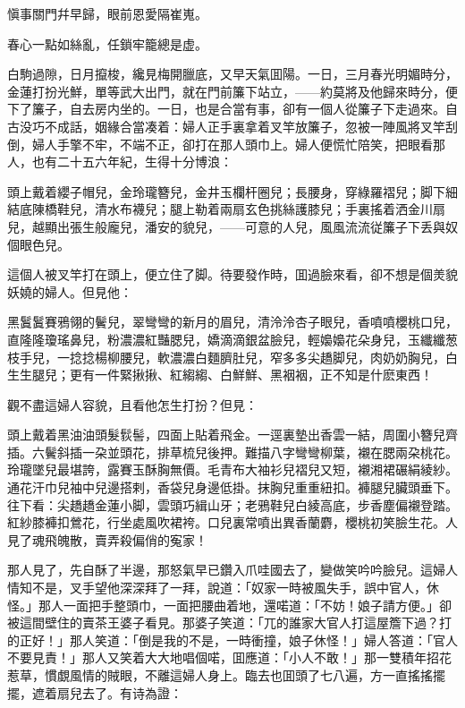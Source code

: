 \begin{myquote}
愼事關門幷早歸，眼前恩愛隔崔嵬。

春心一點如絲亂，任鎖牢籠總是虚。
\end{myquote}

白駒過隙，日月攛梭，纔見梅開臘底，又早天氣囬陽。一日，三月春光明媚時分，金蓮打扮光鮮，單等武大出門，就在門前簾下站立，——約莫將及他歸來時分，便下了簾子，自去房内坐的。一日，也是合當有事，卻有一個人從簾子下走過來。自古没巧不成話，姻緣合當凑着：婦人正手裏拿着叉竿放簾子，忽被一陣風將叉竿刮倒，婦人手擎不牢，不端不正，卻打在那人頭巾上。婦人便慌忙陪笑，把眼看那人，也有二十五六年紀，生得十分博浪：

\begin{myquote}
頭上戴着纓子帽兒，金玲瓏簪兒，金井玉欄杆圈兒；長腰身，穿綠羅褶兒；脚下細結底陳橋鞋兒，清水布襪兒；腿上勒着兩扇玄色挑絲護膝兒；手裏搖着洒金川扇兒，越顯出張生般龐兒，潘安的貌兒，——可意的人兒，風風流流従簾子下丢與奴個眼色兒。
\end{myquote}

這個人被叉竿打在頭上，便立住了脚。待要發作時，囬過臉來看，卻不想是個羙貌妖嬈的婦人。但見他：

\begin{myquote}
黑鬒鬒賽鴉翎的鬢兒，翠彎彎的新月的眉兒，清泠泠杏子眼兒，香噴噴櫻桃口兒，直隆隆瓊瑤鼻兒，粉濃濃紅豔腮兒，嬌滴滴銀盆臉兒，輕嬝嬝花朵身兒，玉纖纖葱枝手兒，一捻捻楊柳腰兒，軟濃濃白麵臍肚兒，窄多多尖趫脚兒，肉奶奶胸兒，白生生腿兒；更有一件緊揪揪、紅縐縐、白鮮鮮、黑裀裀，正不知是什麽東西！
\end{myquote}

觀不盡這婦人容貌，且看他怎生打扮？但見：

\begin{myquote}
頭上戴着黑油油頭髮䯼髻，四面上貼着飛金。一逕裏墊出香雲一結，周圍小簪兒齊插。六鬢斜插一朶並頭花，排草梳兒後押。難描八字彎彎柳葉，襯在腮兩朶桃花。玲瓏墜兒最堪誇，露賽玉酥胸無價。毛青布大袖衫兒褶兒又短，襯湘裙碾絹綾紗。通花汗巾兒袖中兒邊搭剌，香袋兒身邊低掛。抹胸兒重重紐扣。褲腿兒臟頭垂下。往下看：尖趫趫金蓮小脚，雲頭巧緝山牙；老鴉鞋兒白綾高底，步香塵偏襯登踏。紅紗膝褲扣鶯花，行坐處風吹裙袴。口兒裏常噴出異香蘭麝，櫻桃初笑臉生花。人見了魂飛魄散，賣弄殺偏俏的寃家！
\end{myquote}

那人見了，先自酥了半邊，那怒氣早已鑽入爪哇國去了，變做笑吟吟臉兒。這婦人情知不是，叉手望他深深拜了一拜，說道：「奴家一時被風失手，誤中官人，休怪。」那人一面把手整頭巾，一面把腰曲着地，還喏道：「不妨！娘子請方便。」卻被這間壁住的賣茶王婆子看見。那婆子笑道：「兀的誰家大官人打這屋簷下過？打的正好！」那人笑道：「倒是我的不是，一時衝撞，娘子休怪！」婦人答道：「官人不要見責！」那人又笑着大大地唱個喏，囬應道：「小人不敢！」那一雙積年招花惹草，慣覷風情的賊眼，不離這婦人身上。臨去也囬頭了七八遍，方一直搖搖擺擺，遮着扇兒去了。有诗為證：

